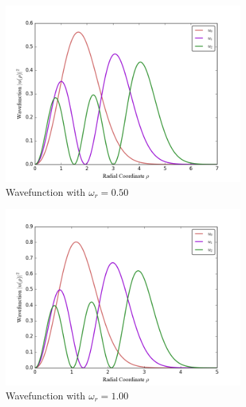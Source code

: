 \documentclass[11pt]{article}
\begin{document}
    \begin{figure}[H] \begin{center}
    \includegraphics[width=0.8\textwidth]{../Code/WavefunctionOmega0p50.png}
    \end{center} 
    \caption{Wavefunction with $\omega_r = 0.50$} \end{figure}

    \begin{figure}[H] \begin{center}
    \includegraphics[width=0.8\textwidth]{../Code/WavefunctionOmega1.png}
    \end{center} \caption{Wavefunction with $\omega_r = 1.00$} \end{figure}
\end{document}
